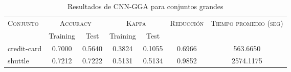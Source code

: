 \begin{table}[]
\centering
\begin{tabular}{l c c c c c c}
\hline
\multirow{2}{*}{\textsc{Conjunto}}
	& \multicolumn{2}{c}{\textsc{Accuracy}}
	& \multicolumn{2}{c}{\textsc{Kappa}}
	& \textsc{Reducción}
	& \textsc{Tiempo promedio (seg)} \\
	& Training & Test
	& Training & Test \\ 
\hline
\hline

credit-card & 0.7000 & 0.5640 & 0.3824 & 0.1055 & 0.6966 & 563.6650 \\
shuttle & 0.7212 & 0.7222 & 0.5131 & 0.5134 & 0.9852 & 2574.1175 \\

\hline
\end{tabular}
\caption{Resultados de CNN-GGA para conjuntos grandes }
\label{res-grande-cnn-gga}
\end{table}

